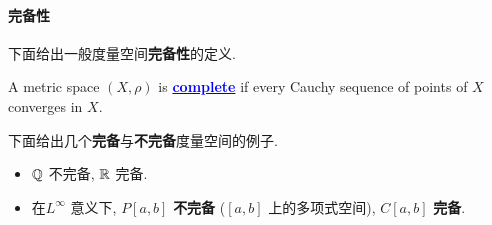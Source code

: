\paragraph{完备性}
	下面给出一般度量空间\textbf{完备性}的定义.
	\begin{defn}\label{def 1.2.3}
		A metric space $(X,  \rho)$ is \underline{\textcolor{blue}{\textbf{complete}}} if every Cauchy sequence of points of $X$ converges in $X$.
		
		\vspace{3em}
		下面给出几个\textbf{完备}与\textbf{不完备}度量空间的例子.
		\begin{example}\label{ex 1.2.1}
			\begin{itemize}
				\item $\mathbb{Q}$ 不完备, $\mathbb{R}$ 完备. 
				
				\item 在$L^\infty$ 意义下, $P[a , b]$ \textbf{不完备} ($[a , b]$ 上的多项式空间), $C[a , b]$ \textbf{完备}.
			\end{itemize}
		\end{example}
	\end{defn}
	
	\vspace{6em}
	
